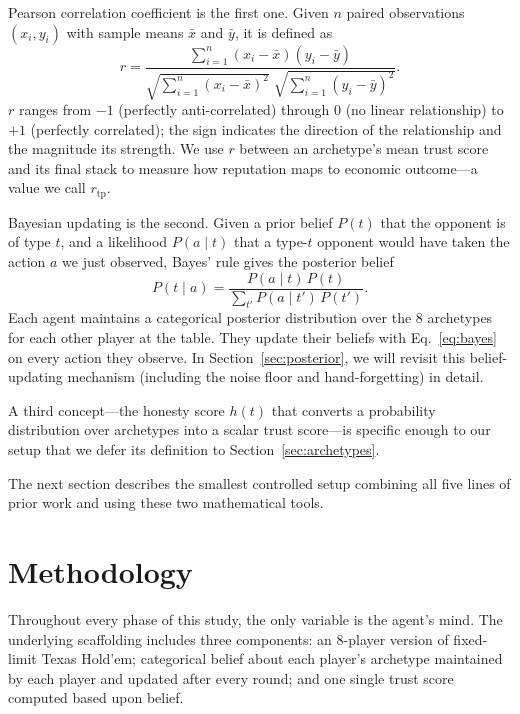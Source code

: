 \documentclass[10pt,twocolumn,letterpaper]{article}
\newcommand{\rtp}{\ensuremath{r_{\mathrm{tp}}}}
\begin{document}
Pearson correlation coefficient is the first one. Given $n$ paired
observations $(x_i, y_i)$ with sample means $\bar{x}$ and
$\bar{y}$, it is defined as
\begin{equation}
  r = \frac{\sum_{i=1}^{n}(x_i-\bar{x})(y_i-\bar{y})}
           {\sqrt{\sum_{i=1}^{n}(x_i-\bar{x})^2}\;
            \sqrt{\sum_{i=1}^{n}(y_i-\bar{y})^2}}.
  \label{eq:pearson}
\end{equation}
$r$ ranges from $-1$ (perfectly anti-correlated) through $0$ (no
linear relationship) to $+1$ (perfectly correlated); the sign
indicates the direction of the relationship and the magnitude its
strength. We use $r$ between an archetype's mean trust score and
its final stack to measure how reputation maps to economic
outcome---a value we call \rtp.

Bayesian updating is the second. Given a prior belief $P(t)$ that
the opponent is of type $t$, and a likelihood $P(a\mid t)$ that a
type-$t$ opponent would have taken the action $a$ we just
observed, Bayes' rule gives the posterior belief
\begin{equation}
  P(t\mid a) = \frac{P(a\mid t)\,P(t)}
                    {\sum_{t'} P(a\mid t')\,P(t')}.
  \label{eq:bayes}
\end{equation}
Each agent maintains a categorical posterior distribution over the
8 archetypes for each other player at the table. They update their
beliefs with Eq.~\ref{eq:bayes} on every action they observe. In
Section~\ref{sec:posterior}, we will revisit this belief-updating
mechanism (including the noise floor and hand-forgetting) in detail.

A third concept---the honesty score $h(t)$ that converts a
probability distribution over archetypes into a scalar trust
score---is specific enough to our setup that we defer its
definition to Section~\ref{sec:archetypes}.

The next section describes the smallest controlled setup combining
all five lines of prior work and using these two mathematical tools.

\section{Methodology}

Throughout every phase of this study, the only variable is the
agent's mind. The underlying scaffolding includes three components:
an 8-player version of fixed-limit Texas Hold'em; categorical belief
about each player's archetype maintained by each player and updated
after every round; and one single trust score computed based upon
belief.
\end{document}
